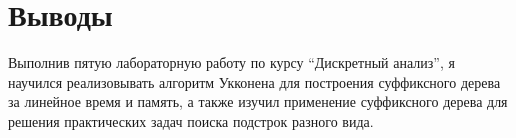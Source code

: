 \section{Выводы}

Выполнив пятую лабораторную работу по курсу \enquote{Дискретный анализ}, я научился реализовывать алгоритм Укконена для построения суффиксного дерева за линейное время и память, а также изучил применение суффиксного дерева для решения практических задач поиска подстрок разного вида.

\pagebreak
